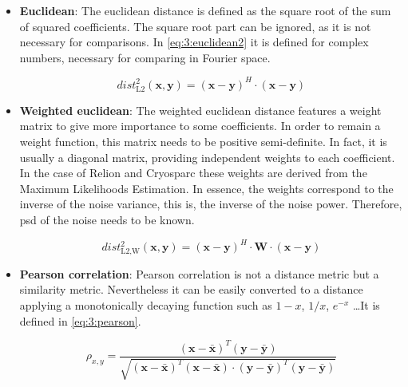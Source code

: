 \documentclass[../main.tex]{subfiles}
\begin{document}
\begin{itemize}
    \item \textbf{Euclidean}: The euclidean distance is defined as the square root of the sum of squared coefficients. The square root part can be ignored, as it is not necessary for comparisons. In \eqref{eq:3:euclidean2} it is defined for complex numbers, necessary for comparing in Fourier space.

    \begin{equation}\label{eq:3:euclidean2}
        dist^2_{\text{L2}}(\bm{x}, \bm{y}) = (\bm{x}-\bm{y})^H \cdot (\bm{x}-\bm{y})
    \end{equation}
    
    \item \textbf{Weighted euclidean}: The weighted euclidean distance features a weight matrix to give more importance to some coefficients. In order to remain a weight function, this matrix needs to be positive semi-definite. In fact, it is usually a diagonal matrix, providing independent weights to each coefficient. In the case of Relion\cite{scheres2021} and Cryosparc\cite{cryosparc} these weights are derived from the Maximum Likelihoods Estimation. In essence, the weights correspond to the inverse of the noise variance, this is, the inverse of the noise power. Therefore, \gls{psd} of the noise needs to be known.
    
    \begin{equation}\label{eq:3:euclidean2_weighted}
        dist^2_{\text{L2,W}}(\bm{x}, \bm{y}) = (\bm{x}-\bm{y})^H \cdot \bm{W} \cdot (\bm{x}-\bm{y})
    \end{equation}
    
    \item \textbf{Pearson correlation}: Pearson correlation is not a distance metric but a similarity metric. Nevertheless it can be easily converted to a distance applying a monotonically decaying function such as $1-x$, $1/x$, $e^{-x}$ \dots It is defined in \eqref{eq:3:pearson}.
    
    \begin{equation}\label{eq:3:pearson}
        \rho_{x,y} =    \frac{
                        (\bm{x}-\bar{\bm{x}})^T(\bm{y}-\bar{\bm{y}})
                        }{
                        \sqrt{(\bm{x}-\bar{\bm{x}})^T(\bm{x}-\bar{\bm{x}}) \cdot (\bm{y}-\bar{\bm{y}})^T(\bm{y}-\bar{\bm{y}})}
                        }
    \end{equation}
\end{itemize}
\end{document}
